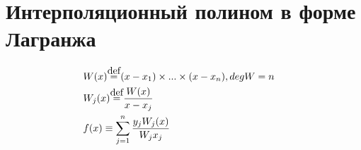 \documentclass[../main.tex]{subfiles}
\begin{document}
\section{Интерполяционный полином в форме Лагранжа}


\newcommand\myeq{\stackrel{\mathclap{\normalfont\mbox{def}}}{=}}

\begin{align*}
    & W(x) \myeq (x - x_1) \times ... \times (x - x_n), deg W = n & \\
    & W_j(x) \myeq \frac{W(x)}{x - x_j} & \\
    & f(x) \equiv \sum_{j=1}^{n} \frac{y_j W_j(x)}{W_j{x_j}} &
\end{align*}
\end{document}
